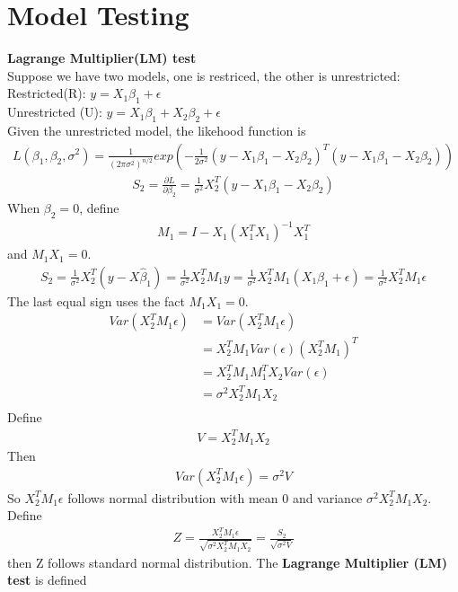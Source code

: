 \documentclass[a4paper]{article}
\begin{document}
\section{Model Testing}
{\bf Lagrange Multiplier(LM) test}\\
Suppose we have two models, one is restriced, the other is unrestricted:
Restricted(R): $y = X_1 \beta_1 + \epsilon$\\
Unrestricted (U): $y = X_1 \beta_1 + X_2 \beta_2 + \epsilon$\\
Given the unrestricted model, the likehood function is 
\begin{align*}
L(\beta_1, \beta_2, \sigma^2) = \frac{1}{(2\pi \sigma^2)^{n/2}}exp(-\frac{1}{2\sigma^2}(y-X_1\beta_1-X_2\beta_2)^T(y-X_1\beta_1-X_2\beta_2))
\end{align*}
\begin{align*}
S_2 = \frac{\partial L}{\partial \beta_2} =\frac{1}{\sigma^2}X_2^T(y - X_1\beta_1-X_2\beta_2)
\end{align*}
When $\beta_2=0$, define
\begin{align*}
M_1 = I - X_1(X^T_1X_1)^{-1}X^T_1
\end{align*}
and $M_1X_1=0$.
\begin{align*}
S_2 =\frac{1}{\sigma^2}X_2^T(y-X\hat \beta_1)=\frac{1}{\sigma^2}X_2^TM_1y = \frac{1}{\sigma^2}X_2^TM_1(X_1 \beta_1 + \epsilon) = \frac{1}{\sigma^2}X_2^TM_1 \epsilon
\end{align*}
The last equal sign uses the fact $M_1X_1 = 0$.
\begin{align*}
 Var(X_2^TM_1 \epsilon) & = Var(X_2^TM_1 \epsilon) \\
             & =  X_2^TM_1Var(\epsilon)(X_2^TM_1)^T \\
             & =  X_2^TM_1 M_1^T X_2Var(\epsilon) \\
             & = \sigma^2  X_2^TM_1X_2 \\
\end{align*}
Define
\begin{align*}
V =  X_2^TM_1X_2
\end{align*}
Then
\begin{align*}
Var(X_2^T M_1 \epsilon) = \sigma^2V
\end{align*}
So $X_2^TM_1\epsilon$ follows normal distribution with mean 0 and variance $\sigma^2X_2^TM_1X_2$. Define
\begin{align*}
Z=\frac{X_2^TM_1\epsilon}{\sqrt{\sigma^2X_2^TM_1X_2}} = \frac{S_2}{\sqrt{\sigma^2V}}
\end{align*}
then Z follows standard normal distribution. The {\bf Lagrange Multiplier (LM) test} is defined
\end{document}
